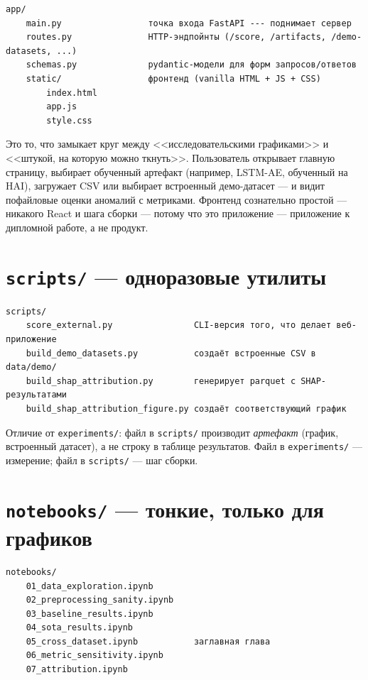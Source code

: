 \documentclass[11pt,a4paper]{article}
\newcommand{\code}[1]{\texttt{#1}}
\begin{document}
\begin{Verbatim}
app/
    main.py                 точка входа FastAPI --- поднимает сервер
    routes.py               HTTP-эндпойнты (/score, /artifacts, /demo-datasets, ...)
    schemas.py              pydantic-модели для форм запросов/ответов
    static/                 фронтенд (vanilla HTML + JS + CSS)
        index.html
        app.js
        style.css
\end{Verbatim}

Это то, что замыкает круг между <<исследовательскими графиками>> и <<штукой, на которую можно ткнуть>>. Пользователь открывает главную страницу, выбирает обученный артефакт (например, LSTM-AE, обученный на HAI), загружает CSV или выбирает встроенный демо-датасет --- и видит пофайловые оценки аномалий с метриками. Фронтенд сознательно простой --- никакого React и шага сборки --- потому что это приложение --- приложение к дипломной работе, а не продукт.

\section{\texttt{scripts/} --- одноразовые утилиты}

\begin{Verbatim}
scripts/
    score_external.py                CLI-версия того, что делает веб-приложение
    build_demo_datasets.py           создаёт встроенные CSV в data/demo/
    build_shap_attribution.py        генерирует parquet с SHAP-результатами
    build_shap_attribution_figure.py создаёт соответствующий график
\end{Verbatim}

Отличие от \code{experiments/}: файл в \code{scripts/} производит \emph{артефакт} (график, встроенный датасет), а не строку в таблице результатов. Файл в \code{experiments/} --- измерение; файл в \code{scripts/} --- шаг сборки.

\section{\texttt{notebooks/} --- тонкие, только для графиков}

\begin{Verbatim}
notebooks/
    01_data_exploration.ipynb
    02_preprocessing_sanity.ipynb
    03_baseline_results.ipynb
    04_sota_results.ipynb
    05_cross_dataset.ipynb           заглавная глава
    06_metric_sensitivity.ipynb
    07_attribution.ipynb
\end{Verbatim}
\end{document}
